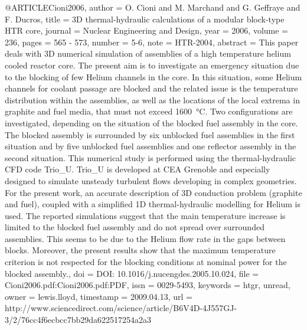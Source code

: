 {@ARTICLE{Cioni2006,
  author = {O. Cioni and M. Marchand and G. Geffraye and F. Ducros},
  title = {3D thermal-hydraulic calculations of a modular block-type HTR core},
  journal = {Nuclear Engineering and Design},
  year = {2006},
  volume = {236},
  pages = {565 - 573},
  number = {5-6},
  note = {HTR-2004},
  abstract = {This paper deals with 3D numerical simulation of assemblies of a high
	temperature helium cooled reactor core. The present aim is to investigate
	an emergency situation due to the blocking of few Helium channels
	in the core. In this situation, some Helium channels for coolant
	passage are blocked and the related issue is the temperature distribution
	within the assemblies, as well as the locations of the local extrema
	in graphite and fuel media, that must not exceed 1600 °C. Two configurations
	are investigated, depending on the situation of the blocked fuel
	assembly in the core. The blocked assembly is surrounded by six unblocked
	fuel assemblies in the first situation and by five unblocked fuel
	assemblies and one reflector assembly in the second situation. This
	numerical study is performed using the thermal-hydraulic CFD code
	Trio_U. Trio_U is developed at CEA Grenoble and especially designed
	to simulate unsteady turbulent flows developing in complex geometries.
	For the present work, an accurate description of 3D conduction problem
	(graphite and fuel), coupled with a simplified 1D thermal-hydraulic
	modelling for Helium is used. The reported simulations suggest that
	the main temperature increase is limited to the blocked fuel assembly
	and do not spread over surrounded assemblies. This seems to be due
	to the Helium flow rate in the gaps between blocks. Moreover, the
	present results show that the maximum temperature criterion is not
	respected for the blocking conditions at nominal power for the blocked
	assembly.},
  doi = {DOI: 10.1016/j.nucengdes.2005.10.024},
  file = {Cioni2006.pdf:Cioni2006.pdf:PDF},
  issn = {0029-5493},
  keywords = {htgr, unread},
  owner = {lewis.lloyd},
  timestamp = {2009.04.13},
  url = {http://www.sciencedirect.com/science/article/B6V4D-4J557GJ-3/2/76cc4f6ecbcc7bb29da622517254a2a3}
}

}
